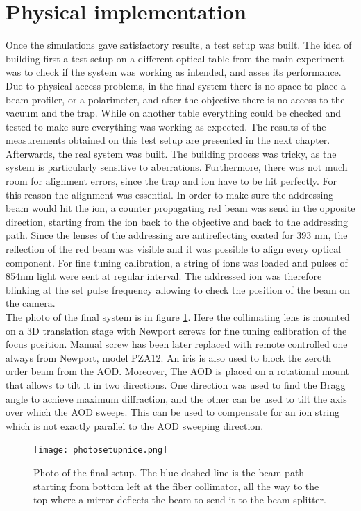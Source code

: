 \section{Physical implementation}
\label{design4}
Once the simulations gave satisfactory results, a test setup was built. The idea of building first a test setup on a different optical table from the main experiment was to check if the system was working as intended, and asses its performance. Due to physical access problems, in the final system there is no space to place a beam profiler, or a polarimeter, and after the objective there is no access to the vacuum and the trap. While on another table everything could be checked and tested to make sure everything was working as expected. The results of the measurements obtained on this test setup are presented in the next chapter.\\
Afterwards, the real system was built. The building process was tricky, as the system is particularly sensitive to aberrations. Furthermore, there was not much room for alignment errors, since the trap and ion have to be hit perfectly. For this reason the alignment was essential. In order to make sure the addressing beam would hit the ion, a counter propagating red beam was send in the opposite direction, starting from the ion back to the objective and back to the addressing path. Since the lenses of the addressing are antireflecting coated for 393 nm, the reflection of the red beam was visible and it was possible to align every optical component. For fine tuning calibration, a string of ions was loaded and pulses of 854nm light were sent at regular interval. The addressed ion was therefore blinking at the set pulse frequency allowing to check the position of the beam on the camera.\\
The photo of the final system is in figure \ref{photosetup}. Here the collimating lens is mounted on a 3D translation stage with Newport screws for fine tuning calibration of the focus position. Manual screw has been later replaced with remote controlled one always from Newport, model PZA12. An iris is also used to block the zeroth order beam from the AOD. Moreover, The AOD is placed on a rotational mount that allows to tilt it in two directions. One direction was used to find the Bragg angle to achieve maximum diffraction, and the other can be used to tilt the axis over which the AOD sweeps. This can be used to compensate for an ion string which is not exactly parallel to the AOD sweeping direction.

\begin{figure}[H]
\centering
\texttt{[image: photosetupnice.png]}
\caption{Photo of the final setup. The blue dashed line is the beam path starting from bottom left at the fiber collimator, all the way to the top where a mirror deflects the beam to send it to the beam splitter.}
\label{photosetup}
\end{figure}
